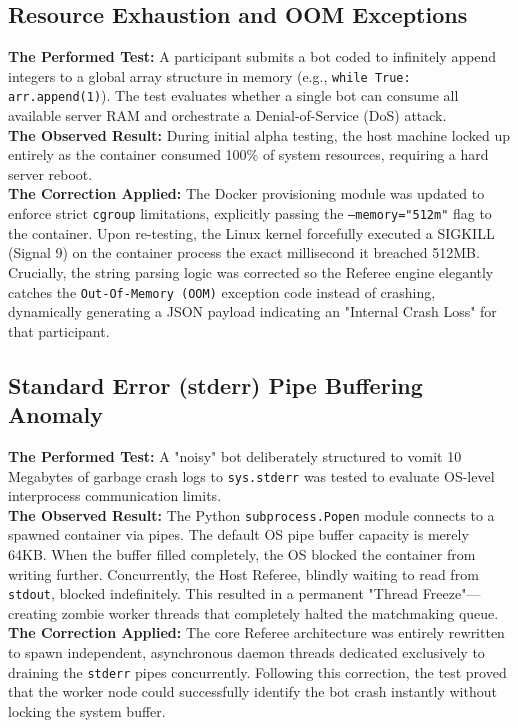 \documentclass[12pt,a4paper]{report}
\begin{document}
\subsection{Resource Exhaustion and OOM Exceptions}
\textbf{The Performed Test:} A participant submits a bot coded to infinitely append integers to a global array structure in memory (e.g., \texttt{while True: arr.append(1)}). The test evaluates whether a single bot can consume all available server RAM and orchestrate a Denial-of-Service (DoS) attack. \\
\textbf{The Observed Result:} During initial alpha testing, the host machine locked up entirely as the container consumed 100\% of system resources, requiring a hard server reboot. \\
\textbf{The Correction Applied:} The Docker provisioning module was updated to enforce strict \texttt{cgroup} limitations, explicitly passing the \texttt{--memory="512m"} flag to the container. Upon re-testing, the Linux kernel forcefully executed a SIGKILL (Signal 9) on the container process the exact millisecond it breached 512MB. Crucially, the string parsing logic was corrected so the Referee engine elegantly catches the \texttt{Out-Of-Memory (OOM)} exception code instead of crashing, dynamically generating a JSON payload indicating an "Internal Crash Loss" for that participant.

\subsection{Standard Error (stderr) Pipe Buffering Anomaly}
\textbf{The Performed Test:} A "noisy" bot deliberately structured to vomit 10 Megabytes of garbage crash logs to \texttt{sys.stderr} was tested to evaluate OS-level interprocess communication limits. \\
\textbf{The Observed Result:} The Python \texttt{subprocess.Popen} module connects to a spawned container via pipes. The default OS pipe buffer capacity is merely 64KB. When the buffer filled completely, the OS blocked the container from writing further. Concurrently, the Host Referee, blindly waiting to read from \texttt{stdout}, blocked indefinitely. This resulted in a permanent "Thread Freeze"—creating zombie worker threads that completely halted the matchmaking queue. \\
\textbf{The Correction Applied:} The core Referee architecture was entirely rewritten to spawn independent, asynchronous daemon threads dedicated exclusively to draining the \texttt{stderr} pipes concurrently. Following this correction, the test proved that the worker node could successfully identify the bot crash instantly without locking the system buffer.
\end{document}
